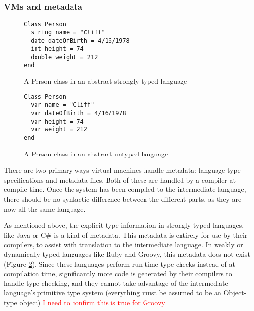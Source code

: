 \documentclass{sig-alternate}
\newcommand{\mycomment}[1]{\textcolor{red}{#1}}
\begin{document}
\subsubsection*{VMs and metadata}

\begin{figure}
\begin{verbatim}
Class Person
  string name = "Cliff"
  date dateOfBirth = 4/16/1978
  int height = 74
  double weight = 212
end
\end{verbatim}
\caption{A Person class in an abstract strongly-typed language}
\label{typedExample}
\end{figure}

\begin{figure}
\begin{verbatim}
Class Person
  var name = "Cliff"
  var dateOfBirth = 4/16/1978
  var height = 74
  var weight = 212
end
\end{verbatim}
\caption{A Person class in an abstract untyped language}
\label{untypedExample}
\end{figure}





There are two primary ways virtual machines handle metadata: language type specifications and metadata files. Both of these are handled by a compiler at compile time.
Once the system has been compiled to the intermediate language, there should be no syntactic difference between the different parts, as they are now all the same language.

As mentioned above, the explicit type information in \linebreak
strongly-typed languages, like Java or C\# is a kind of metadata. This metadata is entirely for use by their compilers, to assist with translation to the intermediate language.
In weakly or dynamically typed languages like Ruby and Groovy, this metadata does not exist (Figure \ref{untypedExample}). Since these languages perform run-time type checks instead of at compilation time, significantly more code is generated by their compilers to handle type checking, and they cannot take advantage of the intermediate language's primitive type system (everything must be assumed to be an Object-type object)
\mycomment{I need to confirm this is true for Groovy}
\end{document}
